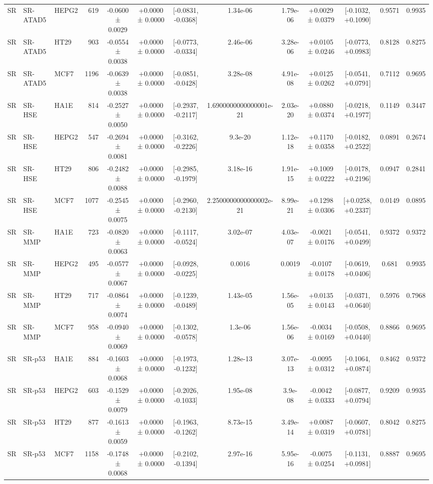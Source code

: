 \begin{landscape}
\begin{longtable}{lll r ccccc cccc}
SR & SR-ATAD5 & HEPG2 & 619 & -0.0600 ± 0.0029 & +0.0000 ± 0.0000 & [-0.0831, -0.0368] & 1.34e-06 & 1.79e-06 & +0.0029 ± 0.0379 & [-0.1032, +0.1090] & 0.9571 & 0.9935 \\
SR & SR-ATAD5 & HT29 & 903 & -0.0554 ± 0.0038 & +0.0000 ± 0.0000 & [-0.0773, -0.0334] & 2.46e-06 & 3.28e-06 & +0.0105 ± 0.0246 & [-0.0773, +0.0983] & 0.8128 & 0.8275 \\
SR & SR-ATAD5 & MCF7 & 1196 & -0.0639 ± 0.0038 & +0.0000 ± 0.0000 & [-0.0851, -0.0428] & 3.28e-08 & 4.91e-08 & +0.0125 ± 0.0262 & [-0.0541, +0.0791] & 0.7112 & 0.9695 \\
\addlinespace[1.5pt]
SR & SR-HSE & HA1E & 814 & -0.2527 ± 0.0050 & +0.0000 ± 0.0000 & [-0.2937, -0.2117] & 1.6900000000000001e-21 & 2.03e-20 & +0.0880 ± 0.0374 & [-0.0218, +0.1977] & 0.1149 & 0.3447 \\
SR & SR-HSE & HEPG2 & 547 & -0.2694 ± 0.0081 & +0.0000 ± 0.0000 & [-0.3162, -0.2226] & 9.3e-20 & 1.12e-18 & +0.1170 ± 0.0358 & [-0.0182, +0.2522] & 0.0891 & 0.2674 \\
SR & SR-HSE & HT29 & 806 & -0.2482 ± 0.0088 & +0.0000 ± 0.0000 & [-0.2985, -0.1979] & 3.18e-16 & 1.91e-15 & +0.1009 ± 0.0222 & [-0.0178, +0.2196] & 0.0947 & 0.2841 \\
SR & SR-HSE & MCF7 & 1077 & -0.2545 ± 0.0075 & +0.0000 ± 0.0000 & [-0.2960, -0.2130] & 2.2500000000000002e-21 & 8.99e-21 & +0.1298 ± 0.0306 & [+0.0258, +0.2337] & 0.0149 & 0.0895 \\
\addlinespace[1.5pt]
SR & SR-MMP & HA1E & 723 & -0.0820 ± 0.0063 & +0.0000 ± 0.0000 & [-0.1117, -0.0524] & 3.02e-07 & 4.03e-07 & -0.0021 ± 0.0176 & [-0.0541, +0.0499] & 0.9372 & 0.9372 \\
SR & SR-MMP & HEPG2 & 495 & -0.0577 ± 0.0067 & +0.0000 ± 0.0000 & [-0.0928, -0.0225] & 0.0016 & 0.0019 & -0.0107 ± 0.0178 & [-0.0619, +0.0406] & 0.681 & 0.9935 \\
SR & SR-MMP & HT29 & 717 & -0.0864 ± 0.0074 & +0.0000 ± 0.0000 & [-0.1239, -0.0489] & 1.43e-05 & 1.56e-05 & +0.0135 ± 0.0143 & [-0.0371, +0.0640] & 0.5976 & 0.7968 \\
SR & SR-MMP & MCF7 & 958 & -0.0940 ± 0.0069 & +0.0000 ± 0.0000 & [-0.1302, -0.0578] & 1.3e-06 & 1.56e-06 & -0.0034 ± 0.0169 & [-0.0508, +0.0440] & 0.8866 & 0.9695 \\
\addlinespace[1.5pt]
SR & SR-p53 & HA1E & 884 & -0.1603 ± 0.0068 & +0.0000 ± 0.0000 & [-0.1973, -0.1232] & 1.28e-13 & 3.07e-13 & -0.0095 ± 0.0312 & [-0.1064, +0.0874] & 0.8462 & 0.9372 \\
SR & SR-p53 & HEPG2 & 603 & -0.1529 ± 0.0079 & +0.0000 ± 0.0000 & [-0.2026, -0.1033] & 1.95e-08 & 3.9e-08 & -0.0042 ± 0.0333 & [-0.0877, +0.0794] & 0.9209 & 0.9935 \\
SR & SR-p53 & HT29 & 877 & -0.1613 ± 0.0059 & +0.0000 ± 0.0000 & [-0.1963, -0.1262] & 8.73e-15 & 3.49e-14 & +0.0087 ± 0.0319 & [-0.0607, +0.0781] & 0.8042 & 0.8275 \\
SR & SR-p53 & MCF7 & 1158 & -0.1748 ± 0.0068 & +0.0000 ± 0.0000 & [-0.2102, -0.1394] & 2.97e-16 & 5.95e-16 & -0.0075 ± 0.0254 & [-0.1131, +0.0981] & 0.8887 & 0.9695 \\
\bottomrule
\end{longtable}
\end{landscape}
